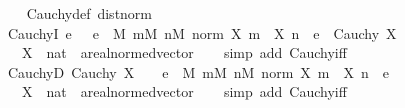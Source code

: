 \begin{isabellebody}
%
\isadelimproof
\ \ %
\endisadelimproof
%
\isatagproof
{}\isamarkupfalse%
\ Cauchy{\isacharunderscore}{\kern0pt}def\ dist{\isacharunderscore}{\kern0pt}norm\ \isacommand{{\isachardot}{\kern0pt}{\isachardot}{\kern0pt}}\isamarkupfalse%
%
\endisatagproof
{\isafoldproof}%
%
\isadelimproof
\isanewline
%
\endisadelimproof
\isanewline
{}\isamarkupfalse%
\ CauchyI{\isacharcolon}{\kern0pt}\ {\isachardoublequoteopen}{\isacharparenleft}{\kern0pt}{\isasymAnd}e{\isachardot}{\kern0pt}\ {}\ {\isacharless}{\kern0pt}\ e\ {\isasymLongrightarrow}\ {\isasymexists}M{\isachardot}{\kern0pt}\ {\isasymforall}m{\isasymge}M{\isachardot}{\kern0pt}\ {\isasymforall}n{\isasymge}M{\isachardot}{\kern0pt}\ norm\ {\isacharparenleft}{\kern0pt}X\ m\ {\isacharminus}{\kern0pt}\ X\ n{\isacharparenright}{\kern0pt}\ {\isacharless}{\kern0pt}\ e{\isacharparenright}{\kern0pt}\ {\isasymLongrightarrow}\ Cauchy\ X{\isachardoublequoteclose}\isanewline
\ \ \ X\ {\isacharcolon}{\kern0pt}{\isacharcolon}{\kern0pt}\ {\isachardoublequoteopen}nat\ {\isasymRightarrow}\ {\isacharprime}{\kern0pt}a{\isacharcolon}{\kern0pt}{\isacharcolon}{\kern0pt}real{\isacharunderscore}{\kern0pt}normed{\isacharunderscore}{\kern0pt}vector{\isachardoublequoteclose}\isanewline
%
\isadelimproof
\ \ %
\endisadelimproof
%
\isatagproof
{}\isamarkupfalse%
\ {\isacharparenleft}{\kern0pt}simp\ add{\isacharcolon}{\kern0pt}\ Cauchy{\isacharunderscore}{\kern0pt}iff{\isacharparenright}{\kern0pt}%
\endisatagproof
{\isafoldproof}%
%
\isadelimproof
\isanewline
%
\endisadelimproof
\isanewline
{}\isamarkupfalse%
\ CauchyD{\isacharcolon}{\kern0pt}\ {\isachardoublequoteopen}Cauchy\ X\ {\isasymLongrightarrow}\ {}\ {\isacharless}{\kern0pt}\ e\ {\isasymLongrightarrow}\ {\isasymexists}M{\isachardot}{\kern0pt}\ {\isasymforall}m{\isasymge}M{\isachardot}{\kern0pt}\ {\isasymforall}n{\isasymge}M{\isachardot}{\kern0pt}\ norm\ {\isacharparenleft}{\kern0pt}X\ m\ {\isacharminus}{\kern0pt}\ X\ n{\isacharparenright}{\kern0pt}\ {\isacharless}{\kern0pt}\ e{\isachardoublequoteclose}\isanewline
\ \ \ X\ {\isacharcolon}{\kern0pt}{\isacharcolon}{\kern0pt}\ {\isachardoublequoteopen}nat\ {\isasymRightarrow}\ {\isacharprime}{\kern0pt}a{\isacharcolon}{\kern0pt}{\isacharcolon}{\kern0pt}real{\isacharunderscore}{\kern0pt}normed{\isacharunderscore}{\kern0pt}vector{\isachardoublequoteclose}\isanewline
%
\isadelimproof
\ \ %
\endisadelimproof
%
\isatagproof
{}\isamarkupfalse%
\ {\isacharparenleft}{\kern0pt}simp\ add{\isacharcolon}{\kern0pt}\ Cauchy{\isacharunderscore}{\kern0pt}iff{\isacharparenright}{\kern0pt}%

\end{isabellebody}
